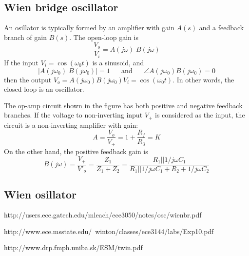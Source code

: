 \subsection{Wien bridge oscillator}


An osillator is typically formed by an amplifier with gain $A(s)$ and
a feedback branch of gain $B(s)$. The open-loop gain is 
\[
\frac{V_o}{V_i}=A(j\omega)\;B(j\omega)
\]
If the input $V_i=\cos(\omega_0 t)$ is a sinusoid, and 
\[
|A(j\omega_0)\;B(j\omega_0)|=1
\;\;\;\;\;\;\mbox{and}\;\;\;\;\;\;
\angle A(j\omega_0)B(j\omega_0)=0
\]
then the output $V_o=A(j\omega_0)B(j\omega_0)V_i=\cos(\omega_0 t)$. In 
other words, the closed loop is an oscillator.


The op-amp circuit shown in the figure has both positive and negative
feedback branches. If the voltage to non-inverting input $V_+$ is 
considered as the input, the circuit is a non-inverting amplifier 
with gain:
\[
A=\frac{V_o}{V_+}=1+\frac{R_f}{R_3}=K
\]
On the other hand, the positive feedback gain is
\[
B(j\omega)=\frac{V_+}{V'_o}=\frac{Z_1}{Z_1+Z_2}
=\frac{R_1||1/j\omega C_1}{R_1||1/j\omega C_1+R_2+1/j\omega C_2}
\]



\subsection{Wien osillator}






http://users.ece.gatech.edu/mleach/ece3050/notes/osc/wienbr.pdf

http://www.ece.msstate.edu/~winton/classes/ece3144/labs/Exp10.pdf

http://www.drp.fmph.uniba.sk/ESM/twin.pdf
